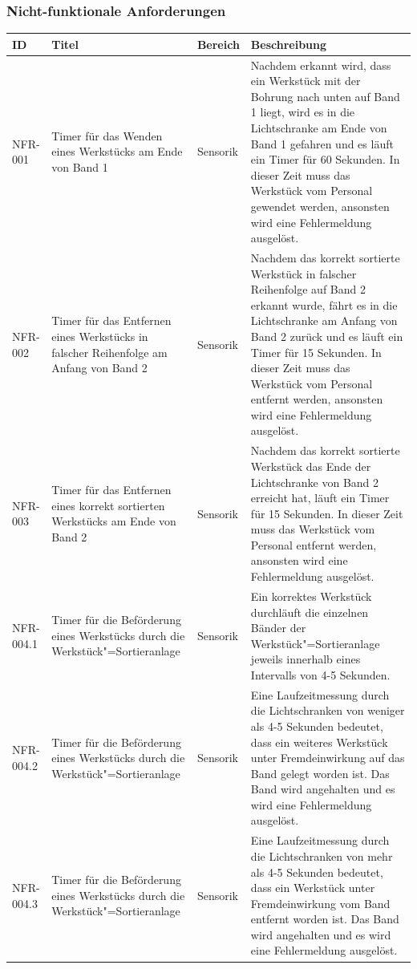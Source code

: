 \documentclass[oneside,a4paper,titlepage]{scrartcl} %
\begin{document}
\subsubsection{Nicht-funktionale Anforderungen}
\begin{small}
 \begin{longtable}{|p{2cm}|p{4cm}|p{1.5cm}|p{5.5cm}|}
  \hline
  \textbf{ID} & \textbf{Titel} & \textbf{Bereich} & \textbf{Beschreibung}\\
  \toprule
  \endhead
  \hline
  NFR-001 & Timer für das Wenden eines Werkstücks am Ende von Band 1 & Sensorik & Nachdem erkannt wird, dass ein Werkstück mit der Bohrung nach unten auf Band 1 liegt, wird es in die Lichtschranke am Ende von Band 1 gefahren und es läuft ein Timer für 60 Sekunden. In dieser Zeit muss das Werkstück vom Personal gewendet werden, ansonsten wird eine Fehlermeldung ausgelöst.\\
  \hline
  \rowcolor{lightgray} NFR-002 & Timer für das Entfernen eines Werkstücks in falscher Reihenfolge am Anfang von Band 2 & Sensorik & Nachdem das korrekt sortierte Werkstück in falscher Reihenfolge auf Band 2 erkannt wurde, fährt es in die Lichtschranke am Anfang von Band 2 zurück und es läuft ein Timer für 15 Sekunden. In dieser Zeit muss das Werkstück vom Personal entfernt werden, ansonsten wird eine Fehlermeldung ausgelöst.\\
  \hline
  NFR-003 & Timer für das Entfernen eines korrekt sortierten Werkstücks am Ende von Band 2 & Sensorik & Nachdem das korrekt sortierte Werkstück das Ende der Lichtschranke von Band 2 erreicht hat, läuft ein Timer für 15 Sekunden. In dieser Zeit muss das Werkstück vom Personal entfernt werden, ansonsten wird eine Fehlermeldung ausgelöst.\\
  \hline
  \rowcolor{lightgray} NFR-004.1 & Timer für die Beförderung eines Werkstücks durch die Werkstück"=Sortieranlage & Sensorik & Ein korrektes Werkstück durchläuft die einzelnen Bänder der Werkstück"=Sortieranlage jeweils innerhalb eines Intervalls von 4-5 Sekunden.\\
  \hline
  \rowcolor{lightgray} NFR-004.2 & Timer für die Beförderung eines Werkstücks durch die Werkstück"=Sortieranlage & Sensorik & Eine Laufzeitmessung durch die Lichtschranken von weniger als 4-5 Sekunden bedeutet, dass ein weiteres Werkstück unter Fremdeinwirkung auf das Band gelegt worden ist. Das Band wird angehalten und es wird eine Fehlermeldung ausgelöst.\\
  \hline
  \rowcolor{lightgray} NFR-004.3 & Timer für die Beförderung eines Werkstücks durch die Werkstück"=Sortieranlage & Sensorik & Eine Laufzeitmessung durch die Lichtschranken von mehr als 4-5 Sekunden bedeutet, dass ein Werkstück unter Fremdeinwirkung vom Band entfernt worden ist. Das Band wird angehalten und es wird eine Fehlermeldung ausgelöst.\\

\end{longtable}
\end{small}
\end{document}
